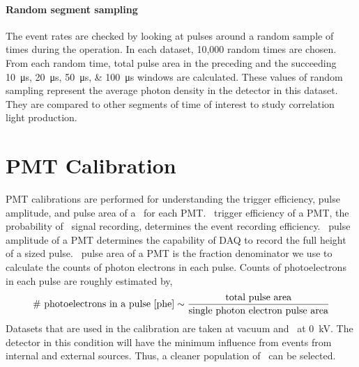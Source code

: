 \paragraph{Random segment sampling}
The event rates are checked by looking at pulses around a random sample of times during the operation. In each dataset, 10,000 random times are chosen. From each random time, total pulse area in the preceding and the succeeding \SIlist{10;20;50;100}{\us} windows are calculated. These values of random sampling represent the average photon density in the detector in this dataset. They are compared to other segments of time of interest to study correlation light production.  

\section{PMT Calibration}
\label{sec:pmt cal} 
PMT calibrations are performed for understanding the trigger efficiency, pulse amplitude, and pulse area of a \sphe\ for each PMT. \sphe\ trigger efficiency of a PMT, the probability of \sphe\ signal recording, determines the event recording efficiency. \sphe\ pulse amplitude of a PMT determines the capability of DAQ to record the full height of a sized pulse. \sphe\ pulse area of a PMT is the fraction denominator we use to calculate the counts of photon electrons in each pulse. Counts of photoelectrons in each pulse are roughly estimated by, 
\begin{align}
  	\text{\#\  photoelectrons in a pulse [\si{phe}]} \sim \frac{\text{total pulse area}}{\text{single photon electron pulse area}}
\end{align}     
Datasets that are used in the calibration are taken at vacuum and \opvtvb\ at \SI{0}{\kV}. The detector in this condition will have the minimum influence from events from internal and external sources. Thus, a cleaner population of \sphe\ can be selected. 
  
  
